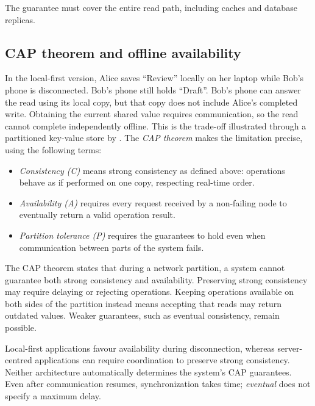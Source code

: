 The guarantee must cover the entire read path, including caches and database replicas.
\parencite[Section~10.3.1]{understanding-distributed-systems}

\newpage
\subsection{CAP theorem and offline availability}

In the local-first version, Alice saves \enquote{Review} locally on her laptop while Bob's phone is disconnected.
Bob's phone still holds \enquote{Draft}.
Bob's phone can answer the read using its local copy, but that copy does not include Alice's completed write.
Obtaining the current shared value requires communication, so the read cannot complete independently offline.
This is the trade-off illustrated through a partitioned key-value store by \textcite[Chapter~6]{system-design-interview}.
The \emph{CAP theorem} makes the limitation precise, using the following terms:
\begin{itemize}
	\item \emph{Consistency (C)} means strong consistency as defined above: operations behave as if performed on one copy, respecting real-time order.
	\item \emph{Availability (A)} requires every request received by a non-failing node to eventually return a valid operation result.
	\item \emph{Partition tolerance (P)} requires the guarantees to hold even when communication between parts of the system fails.
\end{itemize}
The CAP theorem states that during a network partition, a system cannot guarantee both strong consistency and availability.
Preserving strong consistency may require delaying or rejecting operations.
Keeping operations available on both sides of the partition instead means accepting that reads may return outdated values.
Weaker guarantees, such as eventual consistency, remain possible.
\parencites[336--338]{designing-data-intensive-applications}[Section~10.3.4]{understanding-distributed-systems}

Local-first applications favour availability during disconnection, whereas server-centred applications can require coordination to preserve strong consistency.
Neither architecture automatically determines the system's CAP guarantees.
Even after communication resumes, synchronization takes time; \emph{eventual} does not specify a maximum delay.
\parencite[Section~10.3]{understanding-distributed-systems}

